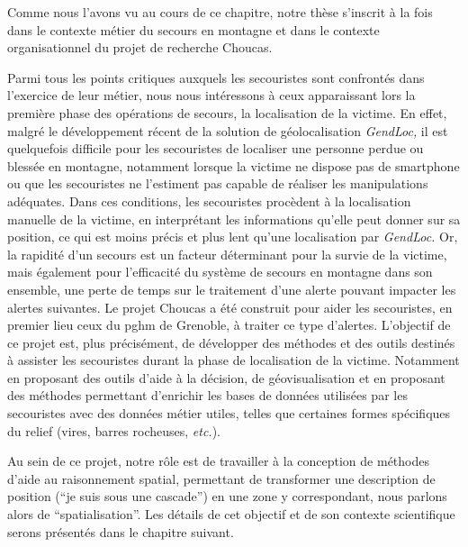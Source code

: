 Comme nous l'avons vu au cours de ce chapitre, notre thèse s'inscrit à
la fois dans le contexte métier du secours en montagne et dans
le contexte organisationnel du projet de recherche Choucas.

Parmi tous les points critiques auxquels les secouristes sont
confrontés dans l'exercice de leur métier, nous nous intéressons à
ceux apparaissant lors la première phase des opérations de secours, la
localisation de la victime. En effet, malgré le développement récent
de la solution de géolocalisation \emph{GendLoc,} il est quelquefois
difficile pour les secouristes de localiser une personne perdue ou
blessée en montagne, notamment lorsque la victime ne dispose pas de
smartphone ou que les secouristes ne l'estiment pas capable de
réaliser les manipulations adéquates. Dans ces conditions, les
secouristes procèdent à la localisation manuelle de la victime, en
interprétant les informations qu'elle peut donner sur sa position, ce
qui est moins précis et plus lent qu'une localisation par
\emph{GendLoc.} Or, la rapidité d'un secours est un facteur
déterminant pour la survie de la victime, mais également pour
l'efficacité du système de secours en montagne dans son ensemble, une
perte de temps sur le traitement d'une alerte pouvant impacter les
alertes suivantes. Le projet Choucas a été construit pour aider les
secouristes, en premier lieu ceux du \ac{pghm} de Grenoble, à traiter
ce type d'alertes. L'objectif de ce projet est, plus précisément, de
développer des méthodes et des outils destinés à assister les
secouristes durant la phase de localisation de la victime. Notamment
en proposant des outils d'aide à la décision, de géovisualisation et
en proposant des méthodes permettant d'enrichir les bases de données
utilisées par les secouristes avec des données métier utiles, telles
que certaines formes spécifiques du relief (\eg vires, barres
rocheuses, \emph{etc.}).

Au sein de ce projet, notre rôle est de travailler à la conception de
méthodes d'aide au raisonnement spatial, permettant de transformer une
description de position (\eg \enquote{je suis sous une cascade}) en
une zone y correspondant, nous parlons alors de
\enquote{spatialisation}. Les détails de cet objectif et de son
contexte scientifique serons présentés dans le chapitre suivant.

